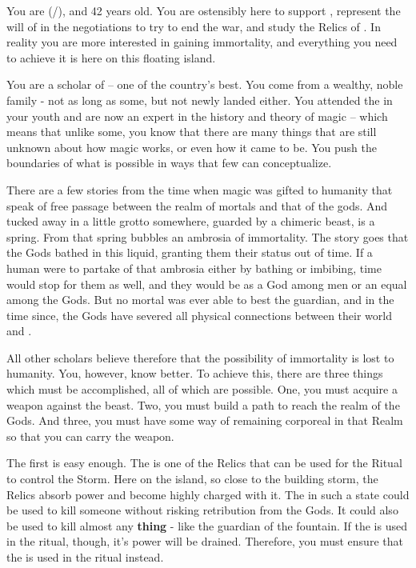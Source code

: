 \documentclass[char]{GL2020}
\begin{document}
\name{\cWildCard{}}

You are \cWildCard{\full} (\cWildCard{\they}/\cWildCard{\them}), and 42 years old. You are ostensibly here to support \cEvil{}, represent the will of \cQueen{\Majesty} \cQueen{}in the negotiations to try to end the war, and study the Relics of \pEarth{}. In reality you are more interested in gaining immortality, and everything you need to achieve it is here on this floating island.

You are a scholar of \pFarm{} -- one of the country’s best. You come from a wealthy, noble family - not as long as some, but not newly landed either. You attended the \pSchool{} in your youth and are now an expert in the history and theory of magic -- which means that unlike some, you know that there are many things that are still unknown about how magic works, or even how it came to be. You push the boundaries of what is possible in ways that few can conceptualize.

There are a few stories from the time when magic was gifted to humanity that speak of free passage between the realm of mortals and that of the gods. And tucked away in a little grotto somewhere, guarded by a chimeric beast, is a spring. From that spring bubbles an ambrosia of immortality. The story goes that the Gods bathed in this liquid, granting them their status out of time. If a human were to partake of that ambrosia either by bathing or imbibing, time would stop for them as well, and they would be as a God among men or an equal among the Gods. But no mortal was ever able to best the guardian, and in the time since, the Gods have severed all physical connections between their world and \pEarth{}.

All other scholars believe therefore that the possibility of immortality is lost to humanity. You, however, know better. To achieve this, there are three things which must be accomplished, all of which are possible. One, you must acquire a weapon against the beast. Two, you must build a path to reach the realm of the Gods.  And three, you must have some way of remaining corporeal in that Realm so that you can carry the weapon.

The first is easy enough. The \iScythe{} is one of the \pFarm{} Relics that can be used for the Ritual to control the Storm. Here on the island, so close to the building storm, the Relics absorb power and become highly charged with it. The \iScythe{} in such a state could be used to kill someone without risking retribution from the Gods. It could also be used to kill almost any \textbf{thing} - like the guardian of the fountain. If the \iScythe{} is used in the ritual, though, it’s power will be drained. Therefore, you must ensure that the \iPitcher{} is used in the ritual instead.
\end{document}
